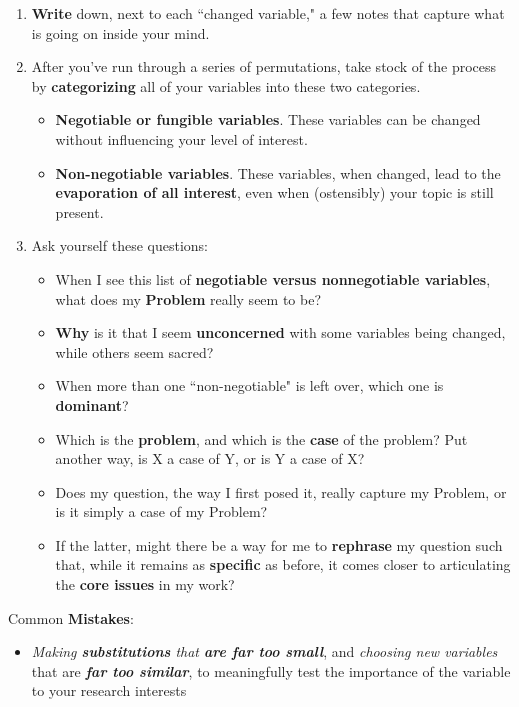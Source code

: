 \documentclass[11pt]{article}
\begin{document}
\begin{itemize}
\begin{exercise}
\begin{enumerate}
\item \textbf{Write} down, next to each ``changed variable," a few notes that capture what is going on inside your mind. 

\item After you’ve run through a series of permutations, take stock of the process by \textbf{categorizing} all of your variables into these two categories. 
\begin{itemize}
\item \textbf{Negotiable or fungible variables}. These variables can be changed without influencing your level of interest. 

\item \textbf{Non-negotiable variables}. These variables, when changed, lead to the \textbf{evaporation of all interest}, even when (ostensibly) your topic is still present.
\end{itemize}

\item Ask yourself these questions:
\begin{itemize}
\item When I see this list of \textbf{negotiable versus nonnegotiable variables}, what does my \textbf{Problem} really seem to be?
\item \textbf{Why} is it that I seem \textbf{unconcerned} with some variables being changed, while others seem sacred?
\item When more than one ``non-negotiable" is left over, which one is \textbf{dominant}?
\item Which is the \textbf{problem}, and which is the \textbf{case} of the problem? Put another way, is X a case of Y, or is Y a case of X?
\item Does my question, the way I first posed it, really capture my Problem, or is it simply a case of my Problem?
\item  If the latter, might there be a way for me to \textbf{rephrase} my question such that, while it remains as \textbf{specific} as before, it comes closer to articulating the \textbf{core issues} in my work?
\end{itemize}
\end{enumerate}
\end{exercise}
Common \textbf{Mistakes}:
\begin{itemize}
\item \emph{Making \textbf{substitutions} that \textbf{are far too small}}, and \emph{choosing new variables} that are \emph{\textbf{far too similar}}, to meaningfully test the importance of the variable to your research interests


\end{itemize}
\end{itemize}
\end{document}
